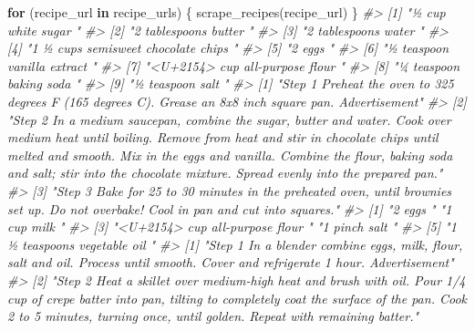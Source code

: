 \documentclass[
]{krantz}
\makeatletter
\newenvironment{Shaded}{\begin{snugshade}}{\end{snugshade}}
\newcommand{\CommentTok}[1]{\textcolor[rgb]{0.37,0.37,0.37}{\textit{#1}}}
\newcommand{\ControlFlowTok}[1]{\textcolor[rgb]{0.27,0.27,0.27}{\textbf{#1}}}
\newcommand{\FunctionTok}[1]{\textcolor[rgb]{0,0,0}{#1}}
\newcommand{\NormalTok}[1]{#1}
\newenvironment{kframe}{%
\medskip{}
\setlength{\fboxsep}{.8em}
 \def\at@end@of@kframe{}%
 \ifinner\ifhmode%
  \def\at@end@of@kframe{\end{minipage}}%
  \begin{minipage}{\columnwidth}%
 \fi\fi%
 \def\FrameCommand##1{\hskip\@totalleftmargin \hskip-\fboxsep
 \colorbox{shadecolor}{##1}\hskip-\fboxsep
     \hskip-\linewidth \hskip-\@totalleftmargin \hskip\columnwidth}%
 \MakeFramed {\advance\hsize-\width
   \@totalleftmargin\z@ \linewidth\hsize
   \@setminipage}}%
 {\par\unskip\endMakeFramed%
 \at@end@of@kframe}
\renewenvironment{Shaded}{\begin{kframe}}{\end{kframe}}
\makeatother
\begin{document}
\begin{Shaded}
\begin{Highlighting}[]
\ControlFlowTok{for}\NormalTok{ (recipe\_url }\ControlFlowTok{in}\NormalTok{ recipe\_urls) \{}
  \FunctionTok{scrape\_recipes}\NormalTok{(recipe\_url)}
\NormalTok{\}}
\CommentTok{\#\textgreater{} [1] "½ cup white sugar "                 }
\CommentTok{\#\textgreater{} [2] "2 tablespoons butter "              }
\CommentTok{\#\textgreater{} [3] "2 tablespoons water "               }
\CommentTok{\#\textgreater{} [4] "1 ½ cups semisweet chocolate chips "}
\CommentTok{\#\textgreater{} [5] "2 eggs "                            }
\CommentTok{\#\textgreater{} [6] "½ teaspoon vanilla extract "        }
\CommentTok{\#\textgreater{} [7] "\textless{}U+2154\textgreater{} cup all{-}purpose flour "    }
\CommentTok{\#\textgreater{} [8] "¼ teaspoon baking soda "            }
\CommentTok{\#\textgreater{} [9] "½ teaspoon salt "                   }
\CommentTok{\#\textgreater{} [1] "Step 1   Preheat the oven to 325 degrees F (165 degrees C). Grease an 8x8 inch square pan.    Advertisement"                                                                                                                                                                                                               }
\CommentTok{\#\textgreater{} [2] "Step 2   In a medium saucepan, combine the sugar, butter and water. Cook over medium heat until boiling. Remove from heat and stir in chocolate chips until melted and smooth. Mix in the eggs and vanilla. Combine the flour, baking soda and salt; stir into the chocolate mixture. Spread evenly into the prepared pan."}
\CommentTok{\#\textgreater{} [3] "Step 3   Bake for 25 to 30 minutes in the preheated oven, until brownies set up. Do not overbake! Cool in pan and cut into squares."                                                                                                                                                                                       }
\CommentTok{\#\textgreater{} [1] "2 eggs "                      "1 cup milk "                 }
\CommentTok{\#\textgreater{} [3] "\textless{}U+2154\textgreater{} cup all{-}purpose flour " "1 pinch salt "               }
\CommentTok{\#\textgreater{} [5] "1 ½ teaspoons vegetable oil "}
\CommentTok{\#\textgreater{} [1] "Step 1   In a blender combine eggs, milk, flour, salt and oil. Process until smooth. Cover and refrigerate 1 hour.    Advertisement"                                                                                                       }
\CommentTok{\#\textgreater{} [2] "Step 2   Heat a skillet over medium{-}high heat and brush with oil. Pour 1/4 cup of crepe batter into pan, tilting to completely coat the surface of the pan. Cook 2 to 5 minutes, turning once, until golden. Repeat with remaining batter."}

\end{Highlighting}
\end{Shaded}
\end{document}
